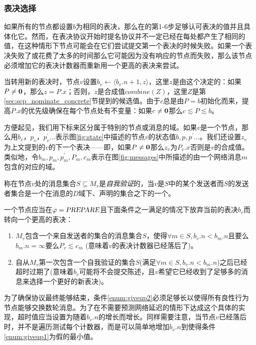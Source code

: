 \subsubsection{表决选择}\label{sec:timers}

如果所有的节点都设置$b$为相同的表决，那么在的第1-6步足够认可表决的值并且具体化它。然而，在表决协议开始时提名协议并不一定已经在每处都产生了相同的值，在这种情形下节点可能会在它们尝试提交第一个表决的时候失败。如果一个表决失败了或花费了太多的时间那么它可能因为没有响应的节点而失败，那么该节点必须增加它的表决计数器而重新用一个更高的表决来尝试。

当转用新的表决时，节点$v$设置$b_v\leftarrow \langle b_v.n+1,z\rangle$，这里$z$是由这个决定的：如果$P\neq {\bm 0}$，那么$z=P.x$；否则，$z$是合成值$combine(Z)$，这里$Z$是第\ref{sec:scp_nominate_concrete}节提到的候选值。由于$c$总是由$P=b$初始化而来，提高$P.x$的优先级确保在每个节点处有不变量：如果$c\neq {\bm 0}$那么$c\lesssim P\lesssim b$。

方便起见，我们用下标来区分属于特别的节点或消息的域。如果$v$是一个节点，那么用$b_v$，$p_v$，$p_v^{\prime}\ldots$表示{图\ref{fig:state}}中描述的节点$v$的状态值$b,p,p^{\prime}\ldots$。我们还设置$z_v$为上文提到的$v$的下一个表决——即，如果$P\neq {\bm 0}$那么$z_v$为$P_v.x$否则是$v$的合成值。类似地，令$b_m,p_m,p^{\prime}_m,P_m,c_m$表示在{图\ref{fig:messages}}中所描述的由一个网络消息$m$包含的对应的域。

\begin{definition}[自我验证]
	称在节点$v$处的消息集合$S\subseteq M_v$是\textit{自我验证}的，当$v$是$S$中的某个发送者而$S$的发送者集合是一个在消息的$D$域下、声明的{\quorum}集合之下的一个{\quorum}。
\end{definition}

一个节点应当在$\varphi=\textsl{PREPARE}$且下面条件之一满足的情况下放弃当前的表决$b_v$而转向一个更高的表决：

\begin{enumerate}
	\item\label{enum:giveup1} $M_v$包含一个来自发送者的{\vblock}集合的消息集合$S$，使得$\forall m\in S,b_v.n<b_m.n$且要么$b_m.n=\infty$要么$P_v\lesssim c_m$ (意味着$v$的表决计数器已经落后了)。
	\item\label{enum:giveup2} 自从$M_v$第一次包含一个自我验证的集合$S$(满足$\forall m\in S,b_v.n<b_m.n$)之后已经超时过期了(意味着$b_v$可能将不会提交陈述，且$v$希望它已经收到了足够多的消息来选择一个更好的新表决)。
\end{enumerate}

为了确保协议最终能够结束，条件\ref{enum:giveup2}必须足够长以使得所有良性行为节点能够交换数轮消息。为了在不需要预测网络延迟的情形下达成这个具体的实现，超时值应当设置为随着$b_v.n$的增长而增长。同样需要注意，当节点$v$已经落后时，并不是遍历测试每个计数器，而是可以简单地增加$b_v.n$到使得条件\ref{enum:giveup1}为假的最小值。